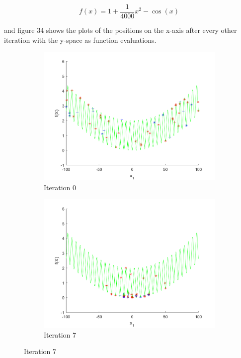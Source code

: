 $$
  f(x) = 1 + \frac{1}{4000}x^2 - \cos(x)
$$

and figure 34 shows the plots of the positions on the x-axis after every other iteration with the y-space as function evaluations.

\begin{figure}
  \centering
 \begin{subfigure}[b]{0.4\textwidth}
   \includegraphics[width=\textwidth]{img/smpl/grwnk1d/loa-iter-0}
   \caption{Iteration 0}
   \label{fig:s6-iter-0}
 \end{subfigure}
 \begin{subfigure}[b]{0.4\textwidth}
   \includegraphics[width=\textwidth]{img/smpl/grwnk1d/loa-iter-7}
   \caption{Iteration 7}

\end{subfigure}
\end{figure}
